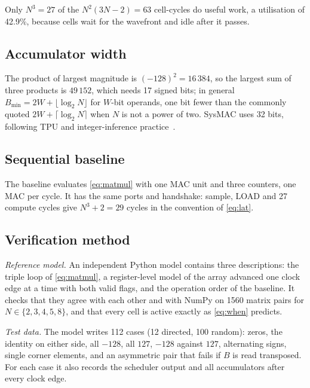 \documentclass[conference]{IEEEtran}
\begin{document}
Only $N^3 = 27$ of the $N^2(3N-2) = 63$ cell-cycles do useful work, a utilisation of 42.9\%, because cells wait for the wavefront and idle after it passes.

\subsection{Accumulator width}
The product of largest magnitude is $(-128)^2 = 16\,384$, so the largest sum of three products is $49\,152$, which needs 17 signed bits; in general $B_{\min} = 2W + \lfloor \log_2 N \rfloor$ for $W$-bit operands, one bit fewer than the commonly quoted $2W + \lceil \log_2 N \rceil$ when $N$ is not a power of two. SysMAC uses 32 bits, following TPU and integer-inference practice~\cite{jouppi2017, jacob2018}.

\subsection{Sequential baseline}
The baseline evaluates \eqref{eq:matmul} with one MAC unit and three counters, one MAC per cycle. It has the same ports and handshake: sample, LOAD and 27 compute cycles give $N^3 + 2 = 29$ cycles in the convention of \eqref{eq:lat}.

\subsection{Verification method}
\label{sec:verif}
\emph{Reference model.} An independent Python model contains three descriptions: the triple loop of \eqref{eq:matmul}, a register-level model of the array advanced one clock edge at a time with both valid flags, and the operation order of the baseline. It checks that they agree with each other and with NumPy on 1560 matrix pairs for $N \in \{2,3,4,5,8\}$, and that every cell is active exactly as \eqref{eq:when} predicts.

\emph{Test data.} The model writes 112 cases (12 directed, 100 random): zeros, the identity on either side, all $-128$, all $127$, $-128$ against $127$, alternating signs, single corner elements, and an asymmetric pair that fails if $B$ is read transposed. For each case it also records the scheduler output and all accumulators after every clock edge.
\end{document}
